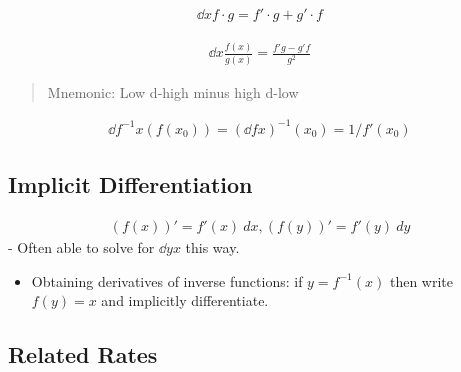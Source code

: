 \begin{proposition}

\begin{align*}
\dd{}{x} f\cdot g =f'\cdot g + g' \cdot f
\end{align*}

\end{proposition}

\begin{proposition}

\begin{align*}
\dd{}{x} \frac{f(x)}{g(x)} = \frac{f'g - g'f}{g^2}
\end{align*}

\begin{quote}
Mnemonic: Low d-high minus high d-low
\end{quote}

\end{proposition}

\begin{proposition}

\begin{align*}
\dd{f^{-1}}{x}(f(x_0)) = \left( \dd{f}{x} \right)^{-1}(x_0) = 1/f'(x_0)
\end{align*}

\end{proposition}

\hypertarget{implicit-differentiation}{%
\subsection{Implicit Differentiation}\label{implicit-differentiation}}

\begin{align*}
(f(x))' = f'(x)~dx, (f(y))' = f'(y)~dy
\end{align*} - Often able to solve for \(\dd{y}{x}\) this way.

\begin{itemize}
\tightlist
\item
  Obtaining derivatives of inverse functions: if \(y = f^{-1}(x)\) then
  write \(f(y) = x\) and implicitly differentiate.
\end{itemize}

\hypertarget{related-rates}{%
\subsection{Related Rates}\label{related-rates}}

